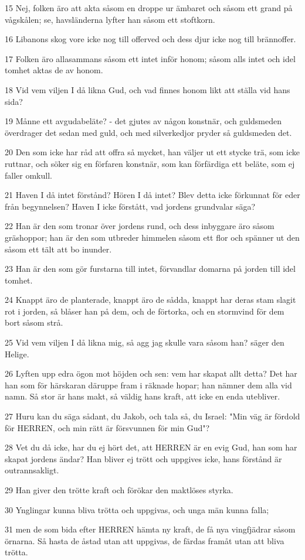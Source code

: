 \par 15 Nej, folken äro att akta såsom en droppe ur ämbaret och såsom ett grand på vågskålen; se, havsländerna lyfter han såsom ett stoftkorn.
\par 16 Libanons skog vore icke nog till offerved och dess djur icke nog till brännoffer.
\par 17 Folken äro allasammans såsom ett intet inför honom; såsom alls intet och idel tomhet aktas de av honom.
\par 18 Vid vem viljen I då likna Gud, och vad finnes honom likt att ställa vid hans sida?
\par 19 Månne ett avgudabeläte? - det gjutes av någon konstnär, och guldsmeden överdrager det sedan med guld, och med silverkedjor pryder så guldsmeden det.
\par 20 Den som icke har råd att offra så mycket, han väljer ut ett stycke trä, som icke ruttnar, och söker sig en förfaren konstnär, som kan förfärdiga ett beläte, som ej faller omkull.
\par 21 Haven I då intet förstånd? Hören I då intet? Blev detta icke förkunnat för eder från begynnelsen? Haven I icke förstått, vad jordens grundvalar säga?
\par 22 Han är den som tronar över jordens rund, och dess inbyggare äro såsom gräshoppor; han är den som utbreder himmelen såsom ett flor och spänner ut den såsom ett tält att bo inunder.
\par 23 Han är den som gör furstarna till intet, förvandlar domarna på jorden till idel tomhet.
\par 24 Knappt äro de planterade, knappt äro de sådda, knappt har deras stam slagit rot i jorden, så blåser han på dem, och de förtorka, och en stormvind för dem bort såsom strå.
\par 25 Vid vem viljen I då likna mig, så agg jag skulle vara såsom han? säger den Helige.
\par 26 Lyften upp edra ögon mot höjden och sen: vem har skapat allt detta? Det har han som för härskaran däruppe fram i räknade hopar; han nämner dem alla vid namn. Så stor är hans makt, så väldig hans kraft, att icke en enda utebliver.
\par 27 Huru kan du säga sådant, du Jakob, och tala så, du Israel: "Min väg är fördold för HERREN, och min rätt är försvunnen för min Gud"?
\par 28 Vet du då icke, har du ej hört det, att HERREN är en evig Gud, han som har skapat jordens ändar? Han bliver ej trött och uppgives icke, hans förstånd är outrannsakligt.
\par 29 Han giver den trötte kraft och förökar den maktlöses styrka.
\par 30 Ynglingar kunna bliva trötta och uppgivas, och unga män kunna falla;
\par 31 men de som bida efter HERREN hämta ny kraft, de få nya vingfjädrar såsom örnarna. Så hasta de åstad utan att uppgivas, de färdas framåt utan att bliva trötta.

